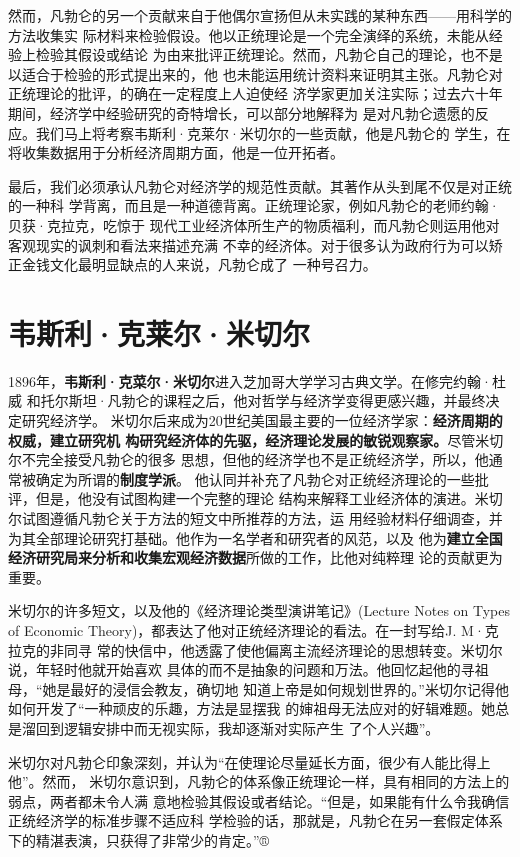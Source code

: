 然而，凡勃仑的另一个贡献来自于他偶尔宣扬但从未实践的某种东西——用科学的方法收集实
际材料来检验假设。他以正统理论是一个完全演绎的系统，未能从经验上检验其假设或结论
为由来批评正统理论。然而，凡勃仑自己的理论，也不是以适合于检验的形式提出来的，他
也未能运用统计资料来证明其主张。凡勃仑对正统理论的批评，的确在一定程度上人迫使经
济学家更加关注实际；过去六十年期间，经济学中经验研究的奇特增长，可以部分地解释为
是对凡勃仑遗愿的反应。我们马上将考察韦斯利·克莱尔·米切尔的一些贡献，他是凡勃仑的
学生，在将收集数据用于分析经济周期方面，他是一位开拓者。

最后，我们必须承认凡勃仑对经济学的规范性贡献。其著作从头到尾不仅是对正统的一种科
学背离，而且是一种道德背离。正统理论家，例如凡勃仑的老师约翰·贝获·克拉克，吃惊于
现代工业经济体所生产的物质福利，而凡勃仑则运用他对客观现实的讽刺和看法来描述充满
不幸的经济体。对于很多认为政府行为可以矫正金钱文化最明显缺点的人来说，凡勃仑成了
一种号召力。

\section{韦斯利·克莱尔·米切尔}

1896年，\textbf{韦斯利·克菜尔·米切尔}进入芝加哥大学学习古典文学。在修完约翰·杜威
和托尔斯坦·凡勃仑的课程之后，他对哲学与经济学变得更感兴趣，并最终决定研究经济学。
米切尔后来成为20世纪美国最主要的一位经济学家：\textbf{经济周期的权威，建立研究机
构研究经济体的先驱，经济理论发展的敏锐观察家。}尽管米切尔不完全接受凡勃仑的很多
思想，但他的经济学也不是正统经济学，所以，他通常被确定为所谓的\textbf{制度学派}。
他认同并补充了凡勃仑对正统经济理论的一些批评，但是，他没有试图构建一个完整的理论
结构来解释工业经济体的演进。米切尔试图遵循凡勃仑关于方法的短文中所推荐的方法，运
用经验材料仔细调查，并为其全部理论研究打基础。他作为一名学者和研究者的风范，以及
他为\textbf{建立全国经济研究局来分析和收集宏观经济数据}所做的工作，比他对纯粹理
论的贡献更为重要。

米切尔的许多短文，以及他的《经济理论类型演讲笔记》(Lecture Notes on Types of
Economic Theory)，都表达了他对正统经济理论的看法。在一封写给J. M·克拉克的非同寻
常的快信中，他透露了使他偏离主流经济理论的思想转变。米切尔说，年轻时他就开始喜欢
具体的而不是抽象的问题和万法。他回忆起他的寻祖母，“她是最好的浸信会教友，确切地
知道上帝是如何规划世界的。”米切尔记得他如何开发了“一种顽皮的乐趣，方法是显摆我
的婶祖母无法应对的好辑难题。她总是溜回到逻辑安排中而无视实际，我却逐渐对实际产生
了个人兴趣”。

米切尔对凡勃仑印象深刻，并认为“在使理论尽量延长方面，很少有人能比得上他”。然而，
米切尔意识到，凡勃仑的体系像正统理论一样，具有相同的方法上的弱点，两者都未令人满
意地检验其假设或者结论。“但是，如果能有什么令我确信正统经济学的标准步骤不适应科
学检验的话，那就是，凡勃仑在另一套假定体系下的精湛表演，只获得了非常少的肯定。”®

